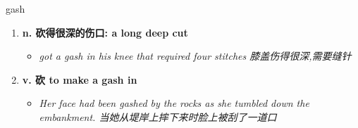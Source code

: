 
\begin{frame}
{\huge gash}
\begin{center}
\begin{enumerate}\Large
  \item \textbf{n. 砍得很深的伤口: a long deep cut}
  \begin{itemize}
    \item \em{\Large{got a gash in his knee that required four stitches 膝盖伤得很深,需要缝针}}
  \end{itemize}
  \item \textbf{v. 砍 to make a gash in}
  \begin{itemize}
    \item \em{\Large{Her face had been gashed by the rocks as she tumbled down the embankment. 当她从堤岸上摔下来时脸上被刮了一道口}}
  \end{itemize}
\end{enumerate}
\end{center}
\end{frame}
